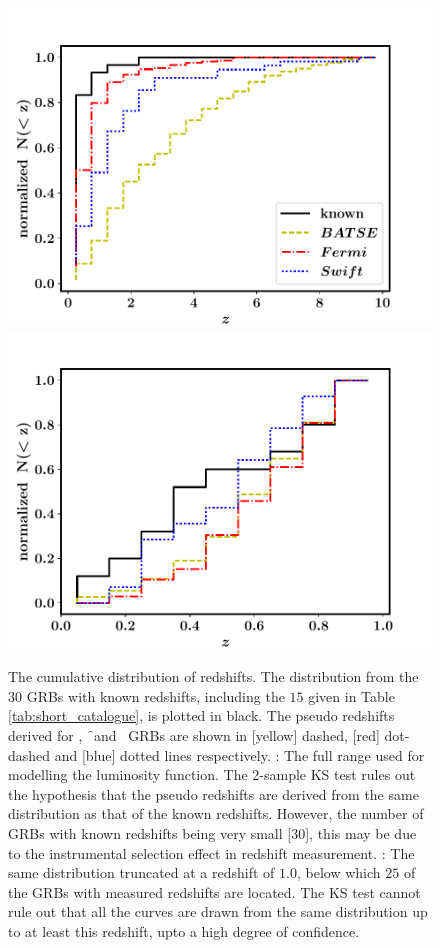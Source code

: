 \begin{figure}
\begin{center}
\includegraphics[scale=0.42]{redshift_distributions--cumulative}
\includegraphics[scale=0.42]{redshift_distributions--cumulative--truncated}
\caption[Cumulative distribution of measured and pseudo redshifts]{The cumulative distribution of redshifts. The distribution from the $30$ GRBs with known redshifts, including the $15$ given in Table \ref{tab:short_catalogue}, is plotted in black. The pseudo redshifts derived for \B, \f\ and \s\ GRBs are shown in [yellow] dashed,  [red] dot-dashed and [blue] dotted lines respectively. \eL: The full range used for modelling the luminosity function. The 2-sample KS test rules out the hypothesis that the pseudo redshifts are derived from the same distribution as that of the known redshifts. However, the number of GRBs with known redshifts being very small [$30$], this may be due to the instrumental selection effect in redshift measurement. \eR: The same distribution truncated at a redshift of $1.0$, below which $25$ of the GRBs with measured redshifts are located. The KS test cannot rule out that all the curves are drawn from the same distribution up to at least this redshift, upto a high degree of confidence.}
\label{fig:z_distribution--short}
\end{center}
\end{figure}


